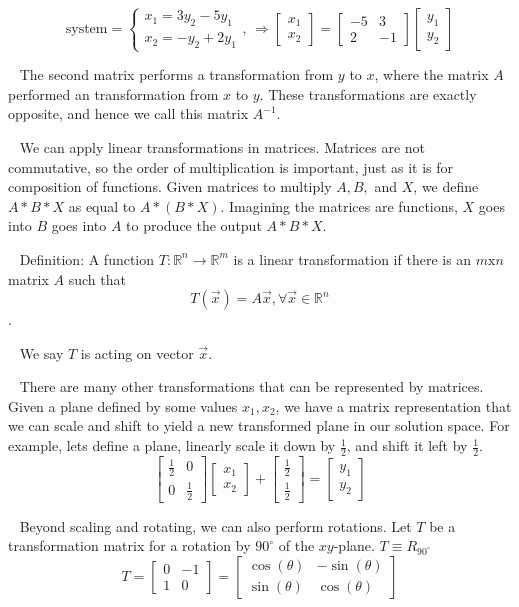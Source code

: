 \documentclass[11pt]{article}
\begin{document}
$$\text{system}=
\left\lbrace\begin{matrix}
x_1=3y_2-5y_1\\ x_2=-y_2+2y_1
\end{matrix}\right. ,\,\Rightarrow \begin{bmatrix}
x_1\\x_2
\end{bmatrix}
=\begin{bmatrix}
-5 & 3\\ 2 & -1
\end{bmatrix}
\begin{bmatrix}
y_1\\y_2
\end{bmatrix}
$$

$\,\,\,$ The second matrix performs a transformation from $y$ to $x$, where the matrix $A$ performed an transformation from $x$ to $y$. These transformations are exactly opposite, and hence we call this matrix $A^{-1}$.

$\,\,\,$ We can apply linear transformations in matrices. Matrices are not commutative, so the order of multiplication is important, just as it is for composition of functions. Given matrices to multiply $A,B,$ and $X$, we define $A*B*X$ as equal to $A*(B*X)$. Imagining the matrices are functions, $X$ goes into $B$ goes into $A$ to produce the output $A*B*X$.

$\,\,\,$ Definition: A function $T:\mathbb{R}^n\rightarrow\mathbb{R}^m$ is a linear transformation if there is an $m\text{x}n$ matrix $A$ such that $$T(\vec{x})=A\vec{x},\forall \vec{x}\in\mathbb{R}^n$$. 

$\,\,\,$ We say $T$ is acting on vector $\vec{x}$.

$\,\,\,$ There are many other transformations that can be represented by matrices. Given a plane defined by some values $x_1,x_2$, we have a matrix representation that we can scale and shift to yield a new transformed plane in our solution space. For example, lets define a plane, linearly scale it down by $\frac{1}{2}$, and shift it left by $\frac{1}{2}$.
$$\begin{bmatrix}
\frac{1}{2} & 0\\ 0 & \frac{1}{2}
\end{bmatrix}
\begin{bmatrix}
x_1\\x_2
\end{bmatrix}+\begin{bmatrix}
\frac{1}{2}\\ \frac{1}{2}
\end{bmatrix}
=\begin{bmatrix}
y_1\\y_2
\end{bmatrix}
$$

$\,\,\,$ Beyond scaling and rotating, we can also perform rotations. Let $T$ be a transformation matrix for a rotation by $90^{\circ}$ of the $xy$-plane. $T\equiv R_{90^\circ}$ $$T=\begin{bmatrix}
0 & -1\\1 & 0
\end{bmatrix}=\begin{bmatrix}
\cos(\theta) & -\sin(\theta)\\ \sin(\theta) & \cos(\theta)
\end{bmatrix}$$
\end{document}
